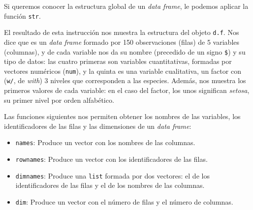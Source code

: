 \documentclass[
]{book}
\newenvironment{Shaded}{\begin{snugshade}}{\end{snugshade}}
\newcommand{\CommentTok}[1]{\textcolor[rgb]{0.56,0.35,0.01}{\textit{#1}}}
\newcommand{\KeywordTok}[1]{\textcolor[rgb]{0.13,0.29,0.53}{\textbf{#1}}}
\newcommand{\NormalTok}[1]{#1}
\providecommand{\tightlist}{%
  \setlength{\itemsep}{0pt}\setlength{\parskip}{0pt}}
\theoremstyle{definition}
\theoremstyle{definition}
\theoremstyle{definition}
\theoremstyle{remark}
\begin{document}
Si queremos conocer la estructura global de un \emph{data frame}, le podemos aplicar la función \texttt{str}.

\begin{Shaded}
\end{Shaded}

El resultado de esta instrucción nos muestra la estructura del objeto \texttt{d.f}. Nos dice que es un \emph{data frame} formado por 150 observaciones (filas) de 5 variables (columnas), y de cada variable nos da su nombre (precedido de un signo \texttt{\$}) y su tipo de datos: las cuatro primeras son variables cuantitativas, formadas por vectores numéricos (\texttt{num}), y la quinta es una variable cualitativa, un factor con (\texttt{w/}, de \emph{with}) 3 niveles que corresponden a las especies. Además, nos muestra los primeros valores de cada variable: en el caso del factor, los unos significan \emph{setosa}, su primer nivel por orden alfabético.

Las funciones siguientes nos permiten obtener los nombres de las variables, los identificadores de las filas y las dimensiones de un \emph{data frame}:

\begin{itemize}
\tightlist
\item
  \texttt{names}: Produce un vector con los nombres de las columnas.
\item
  \texttt{rownames}: Produce un vector con los identificadores de las filas.
\item
  \texttt{dimnames}: Produce una \texttt{list} formada por dos vectores: el de los identificadores de las filas y el de los nombres de las columnas.
\item
  \texttt{dim}: Produce un vector con el número de filas y el número de columnas.
\end{itemize}
\end{document}
